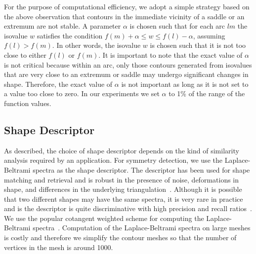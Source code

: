 \documentclass[review,journal]{vgtc}         %
\begin{document}
For the purpose of computational efficiency, we adopt a simple strategy
based on the above observation that contours in the immediate vicinity
of a saddle or an extremum are not stable. A parameter $\alpha$ is chosen
such that for each arc $lm$ the isovalue $w$ satisfies the condition
$f(m)+\alpha \leq w \leq f(l)-\alpha$, assuming $f(l) > f(m)$. In other words,
the isovalue $w$ is chosen such that it is not too close to either
$f(l)$ or $f(m)$. It is important
to note that the exact value of $\alpha$ is not critical because within an arc,
only those contours generated from isovalues that are very close to an extremum or
saddle may undergo significant changes in shape. Therefore, the exact value of $\alpha$
is not important as long as it is not set to a value too close to zero.
In our experiments we set $\alpha$ to 1\% of the range of the function values. 
%
\subsection{Shape Descriptor}
As described, the choice of shape descriptor depends on the kind of similarity
analysis required by an application. For symmetry detection, we use the 
Laplace-Beltrami spectra as the shape descriptor. The descriptor has been used for 
shape matching and retrieval and is robust in the 
presence of noise, deformations in shape, and differences in the underlying 
triangulation~\cite{reuter2006laplace,niethammer2007global,reuter2009laplace}. 
Although it is possible that two different shapes may have the same spectra,
it is very rare in practice~\cite{reuter2006laplace} and is the descriptor is 
quite discriminative
with high precision and recall ratios~\cite{lian2013}. We use the popular cotangent
weighted scheme for computing the Laplace-Beltrami spectra~\cite{PinkallP93}.
Computation of the Laplace-Beltrami spectra on large meshes is costly and therefore
we simplify the contour meshes so that the number of vertices in the mesh is around 1000.
\end{document}
